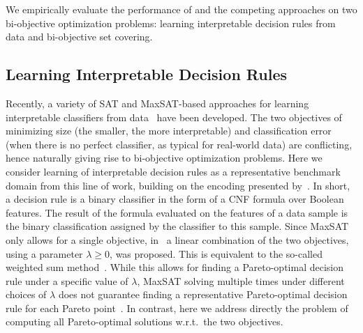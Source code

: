We empirically evaluate the performance of \algname{} and the competing approaches on two bi-objective optimization problems:
learning interpretable decision rules from data and bi-objective set covering.

\subsection{Learning Interpretable Decision Rules\label{sec:lidr}}

Recently, a variety of SAT and MaxSAT-based approaches for learning interpretable classifiers from data~\autocites{DBLP:conf/ijcai/Ignatiev0NS21,DBLP:conf/cp/MaliotovM18,DBLP:conf/ijcai/NarodytskaIPM18,DBLP:conf/ijcai/Hu0HH20,DBLP:journals/corr/abs-2010-09919,DBLP:conf/cp/YuISB20,DBLP:conf/cade/IgnatievPNM18} have been developed.
The two objectives of minimizing size (the smaller, the more interpretable) and classification error (when there is no perfect classifier, as typical for real-world data) are conflicting, hence naturally giving rise to bi-objective optimization problems.
Here we consider learning of interpretable decision rules as a representative benchmark domain from this line of work, building on the encoding presented by~\textcite{DBLP:conf/cp/MaliotovM18}.
In short, a decision rule is a binary classifier in the form of a CNF formula over Boolean features.
The result of the formula evaluated on the features of a data sample is the binary classification assigned by the classifier to this sample.
Since MaxSAT only allows for a single objective, in~\autocite{DBLP:conf/cp/MaliotovM18} a linear combination of the two objectives, using a parameter $\lambda\geq 0$, was proposed.
This is equivalent to the so-called weighted sum method~\autocite{Ehrgott2005-3}.
While this allows for finding a Pareto-optimal decision rule under a specific value of $\lambda$, MaxSAT solving multiple times under different choices of $\lambda$ does not guarantee finding a representative Pareto-optimal decision rule for each Pareto point~\autocites{Ehrgott2005-3,survey}.
In contrast, here we address directly the problem of computing all Pareto-optimal solutions w.r.t.\ the two objectives.
\bigskip

